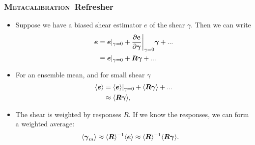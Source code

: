 \documentclass{beamer}
\newcommand{\Mcal}{\textsc{Metacalibration}}
\newcommand{\mcalR}{\mbox{\boldmath $R$}}
\newcommand{\vecg}{\mbox{\boldmath $\gamma$}}
\newcommand{\vest}{\mbox{\boldmath $e$}}
\begin{document}
\frame
{
    \frametitle{\Mcal\ Refresher}

 
    \begin{itemize}

        \item Suppose we have a biased shear estimator {\color{gold} \vest} of the shear {\color{gold} \vecg}.  Then we can write
            {\color{gold}
\begin{align} \label{eq:Eexpand}
    \vest &= \vest|_{\gamma=0} + \frac{ \partial \vest }{ \partial \vecg}\bigg|_{\gamma=0} \vecg  + ... \nonumber \\
          &\equiv \vest|_{\gamma=0} + \mbox{\mcalR}\vecg  + ...
\end{align}
            } 

        \item For an ensemble mean, and for small shear {\color{gold} \vecg}
            {\color{gold}
                \begin{align}
                    \langle \vest \rangle &= \langle \vest \rangle |_{\gamma=0} + \langle \mbox{\mcalR} \vecg \rangle + ... \nonumber \\
                                          &\approx \langle \mbox{\mcalR} \vecg \rangle,
                \end{align}
                }

            \item The shear is weighted by responses {\color{cadetblue} \mcalR}.  If we know the
                responses, we can form a weighted average:
            {\color{gold}
\begin{align} \label{eq:rcorr}
    \langle \vecg_m \rangle &\approx \langle \mbox{\mcalR} \rangle^{-1}  \langle \vest \rangle \approx \langle \mbox{\mcalR} \rangle^{-1} \langle \mcalR \vecg \rangle.
\end{align}
            }
    \end{itemize}
}
\end{document}
